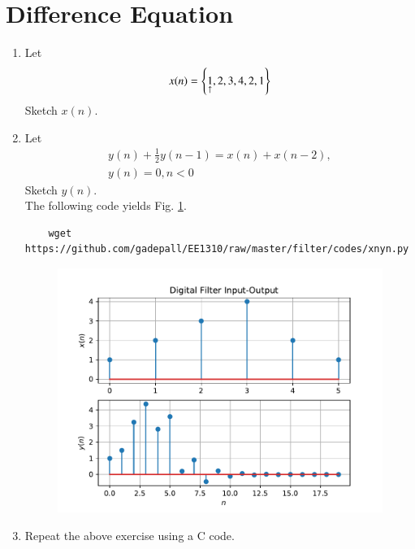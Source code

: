 \documentclass[journal,12pt,twocolumn]{IEEEtran}
\renewcommand\thesection{\arabic{section}}
\begin{document}
\section{Difference Equation}
\begin{enumerate}[label=\thesection.\arabic*,ref=\thesection.\theenumi]
\item Let
\begin{equation}
	x(n) = \left\{\underset{\uparrow}{1},2,3,4,2,1\right\}\label{3.1}
\end{equation}
Sketch $x(n)$.
\item Let
\begin{multline}
	\label{eq:iir_filter}
	y(n) + \frac{1}{2}y(n-1) = x(n) + x(n-2), 
	\\
	y(n) = 0, n < 0
\end{multline}
Sketch $y(n)$.
\\
\solution The following code yields Fig. \ref{fig:xnyn}.
\begin{lstlisting}
	wget https://github.com/gadepall/EE1310/raw/master/filter/codes/xnyn.py
\end{lstlisting}
\begin{figure}[!ht]
	\begin{center}
		\includegraphics[width=\columnwidth]{./figs/xnyn}
	\end{center}
	\label{fig:xnyn}	
\end{figure}
\item Repeat the above exercise using a C code.
\end{enumerate}
\end{document}
